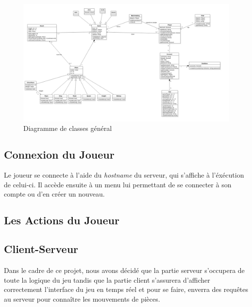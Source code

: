 \documentclass[10pt, a4paper]{article}
\begin{document}
\begin{figure}
\includegraphics[scale=0.5]{ClassDiagram.png}
\caption{Diagramme de classes général}
\label{CD} %
\end{figure}

\newpage

\subsection{Connexion du Joueur}
Le joueur se connecte à l'aide du \textit{hostname} du serveur, qui s'affiche à l'éxécution de celui-ci. Il accède ensuite à un menu lui permettant de se connecter à son compte ou d'en créer un nouveau.

\subsection{Les Actions du Joueur}

\subsection{Client-Serveur}
\paragraph{}Dans le cadre de ce projet, nous avons décidé que la partie serveur s'occupera de toute la logique du jeu tandis que la partie client s'assurera d'afficher correctement l'interface du jeu en temps réel et pour se faire, enverra des requêtes au serveur pour connaître les mouvements de pièces.
\end{document}
